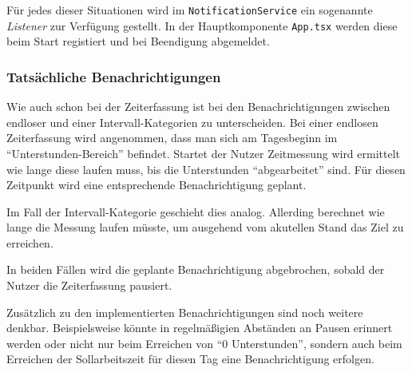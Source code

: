 \noindent
Für jedes dieser Situationen wird im \texttt{NotificationService} ein sogenannte \emph{Listener} zur Verfügung gestellt.
In der Hauptkomponente \texttt{App.tsx} werden diese beim Start registiert und bei Beendigung abgemeldet.

\subsubsection{Tatsächliche Benachrichtigungen}
Wie auch schon bei der Zeiterfassung ist bei den Benachrichtigungen zwischen endloser und einer Intervall-Kategorien zu unterscheiden.
Bei einer endlosen Zeiterfassung wird angenommen,
dass man sich am Tagesbeginn im \enquote{Unterstunden-Bereich} befindet.
Startet der Nutzer Zeitmessung wird ermittelt wie lange diese laufen muss,
bis die Unterstunden \enquote{abgearbeitet} sind.
Für diesen Zeitpunkt wird eine entsprechende Benachrichtigung geplant.

Im Fall der Intervall-Kategorie geschieht dies analog.
Allerding berechnet wie lange die Messung laufen müsste,
um ausgehend vom akutellen Stand das Ziel zu erreichen.

In beiden Fällen wird die geplante Benachrichtigung abgebrochen,
sobald der Nutzer die Zeiterfassung pausiert.

Zusätzlich zu den implementierten Benachrichtigungen sind noch weitere denkbar.
Beispielsweise könnte in regelmäßigien Abständen an Pausen erinnert werden
oder nicht nur beim Erreichen von \enquote{0 Unterstunden},
sondern auch beim Erreichen der Sollarbeitszeit für diesen Tag eine Benachrichtigung erfolgen.